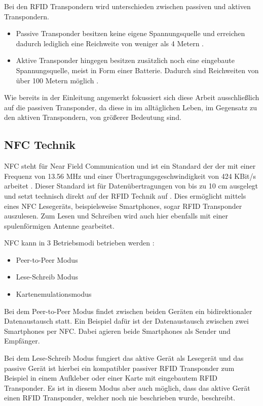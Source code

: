 \documentclass[conference]{IEEEtran}
\begin{document}
Bei den RFID Transpondern wird unterschieden zwischen passiven und aktiven Transpondern.
\begin{itemize}
\item Passive Transponder besitzen keine eigene Spannungsquelle und erreichen dadurch lediglich eine Reichweite von weniger als 4 Metern \cite{b1}.
\item Aktive Transponder hingegen besitzen zusätzlich noch eine eingebaute Spannungsquelle, meist in Form einer Batterie. Dadurch sind Reichweiten von über 100 Metern möglich \cite{b1}.
\end{itemize}
Wie bereits in der Einleitung angemerkt fokussiert sich diese Arbeit ausschließlich auf die passiven Transponder, da diese in im alltäglichen Leben, im Gegensatz zu den aktiven Transpondern, von größerer Bedeutung sind.

\subsection{NFC Technik}
NFC steht für Near Field Communication und ist ein Standard der der mit einer Frequenz von 13.56 MHz und einer Übertragungsgeschwindigkeit von 424 KBit/s arbeitet \cite{b2}. Dieser Standard ist für Datenübertragungen von bis zu 10 cm ausgelegt und setzt technisch direkt auf der RFID Technik auf \cite{b2}. Dies ermöglicht mittels eines NFC Lesegeräts, beispielsweise Smartphones, sogar RFID Transponder auszulesen. Zum Lesen und Schreiben wird auch hier ebenfalls mit einer spulenförmigen Antenne gearbeitet.

NFC kann in 3 Betriebsmodi betrieben werden \cite{b2}:

\begin{itemize}
\item Peer-to-Peer Modus
\item Lese-Schreib Modus
\item Kartenemulationsmodus
\end{itemize}

Bei dem Peer-to-Peer Modus findet zwischen beiden Geräten ein bidirektionaler Datenaustausch statt. Ein Beispiel dafür ist der Datenaustausch zwischen zwei Smartphones per NFC. Dabei agieren beide Smartphones als Sender und Empfänger.

Bei dem Lese-Schreib Modus fungiert das aktive Gerät als Lesegerät und das passive Gerät ist hierbei ein kompatibler passiver RFID Transponder zum Beispiel in einem Aufkleber oder einer Karte mit eingebautem RFID Transponder. Es ist in diesem Modus aber auch möglich, dass das aktive Gerät einen RFID Transponder, welcher noch nie beschrieben wurde, beschreibt.
\end{document}
